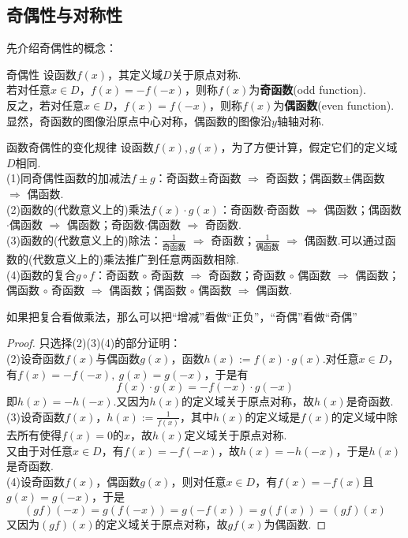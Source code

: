 \documentclass[lang=cn, zihao=5]{elegantbook}
\begin{document}
\newpage
\subsection{奇偶性与对称性}

先介绍奇偶性的概念：

\begin{definition}{奇偶性} %
    设函数$f(x)$，其定义域$D$关于原点对称.\\
    若对任意$x \in D$，$f(x)=-f(-x)$，则称$f(x)$为\textbf{奇函数}(odd function).\\
    反之，若对任意$x \in D$，$f(x)=f(-x)$，则称$f(x)$为\textbf{偶函数}(even function).\\
    显然，奇函数的图像沿原点中心对称，偶函数的图像沿$y$轴轴对称.
\end{definition}

\begin{proposition}{函数奇偶性的变化规律}
    设函数$f(x),g(x)$，为了方便计算，假定它们的定义域$D$相同.\\
    (1)同奇偶性函数的加减法$f \pm g$：奇函数$\pm$奇函数 $\Rightarrow$ 奇函数；偶函数$\pm$偶函数 $\Rightarrow$ 偶函数.\\
    (2)函数的(代数意义上的)乘法$f(x) \cdot g(x)$：奇函数$\cdot$奇函数 $\Rightarrow$ 偶函数；偶函数$\cdot$偶函数 $\Rightarrow$ 偶函数；奇函数$\cdot$偶函数 $\Rightarrow$ 奇函数.\\
    (3)函数的(代数意义上的)除法：$\frac{1}{\text{奇函数}}$ $\Rightarrow$ 奇函数；$\frac{1}{\text{偶函数}}$ $\Rightarrow$ 偶函数.可以通过函数的(代数意义上的)乘法推广到任意两函数相除.\\
    (4)函数的复合$g \circ f$：奇函数 $\circ$ 奇函数 $\Rightarrow$ 奇函数；奇函数 $\circ$ 偶函数 $\Rightarrow$ 偶函数；偶函数 $\circ$ 奇函数 $\Rightarrow$ 偶函数；偶函数 $\circ$ 偶函数 $\Rightarrow$ 偶函数.
\end{proposition}
\begin{remark}
	如果把复合看做乘法，那么可以把“增减”看做“正负”，“奇偶”看做“奇偶”
\end{remark}
\begin{proof}
    只选择(2)(3)(4)的部分证明： \\
    (2)设奇函数$f(x)$与偶函数$g(x)$，函数$h(x):=f(x) \cdot g(x)$.对任意$x \in D$，有$f(x)=-f(-x),~g(x)=g(-x)$，于是有$$f(x) \cdot g(x) = - f(-x) \cdot g(-x)$$
    即$h(x)=-h(-x)$.又因为$h(x)$的定义域关于原点对称，故$h(x)$是奇函数. \\
    (3)设奇函数$f(x)$，$h(x):=\frac{1}{f(x)}$，其中$h(x)$的定义域是$f(x)$的定义域中除去所有使得$f(x)=0$的$x$，故$h(x)$定义域关于原点对称. \\
    又由于对任意$x \in D$，有$f(x)=-f(-x)$，故$h(x)=-h(-x)$，于是$h(x)$是奇函数. \\
    (4)设奇函数$f(x)$，偶函数$g(x)$，则对任意$x \in D$，有$f(x)=-f(x)$且$g(x)=g(-x)$，于是$$(gf)(-x) = g(f(-x)) = g(-f(x)) = g(f(x)) = (gf)(x)$$
    又因为$(gf)(x)$的定义域关于原点对称，故$gf(x)$为偶函数.
\end{proof}
\end{document}
